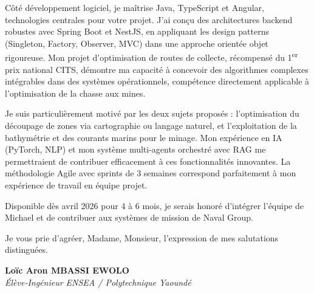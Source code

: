 \documentclass[a4paper,11pt]{article}
\begin{document}
Côté développement logiciel, je maîtrise Java, TypeScript et Angular, technologies centrales pour votre projet. J'ai conçu des architectures backend robustes avec Spring Boot et NestJS, en appliquant les design patterns (Singleton, Factory, Observer, MVC) dans une approche orientée objet rigoureuse. Mon projet d'optimisation de routes de collecte, récompensé du 1\textsuperscript{er} prix national CITS, démontre ma capacité à concevoir des algorithmes complexes intégrables dans des systèmes opérationnels, compétence directement applicable à l'optimisation de la chasse aux mines.

Je suis particulièrement motivé par les deux sujets proposés : l'optimisation du découpage de zones via cartographie ou langage naturel, et l'exploitation de la bathymétrie et des courants marins pour le minage. Mon expérience en IA (PyTorch, NLP) et mon système multi-agents orchestré avec RAG me permettraient de contribuer efficacement à ces fonctionnalités innovantes. La méthodologie Agile avec sprints de 3 semaines correspond parfaitement à mon expérience de travail en équipe projet.

Disponible dès avril 2026 pour 4 à 6 mois, je serais honoré d'intégrer l'équipe de Michael et de contribuer aux systèmes de mission de Naval Group.

Je vous prie d'agréer, Madame, Monsieur, l'expression de mes salutations distinguées.

\vspace{0.8cm}

\textbf{Loïc Aron MBASSI EWOLO}\\
\textit{Élève-Ingénieur ENSEA / Polytechnique Yaoundé}
\end{document}
